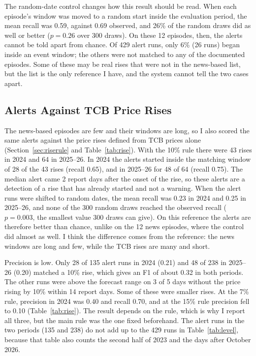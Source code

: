 The random-date control changes how this result should be read. When each episode's window was moved to a random start inside the evaluation period, the mean recall was 0.59, against 0.69 observed, and 26\% of the random draws did as well or better ($p=0.26$ over 300 draws). On these 12 episodes, then, the alerts cannot be told apart from chance. Of 429 alert runs, only 6\% (26 runs) began inside an event window; the others were not matched to any of the documented episodes. Some of these may be real rises that were not in the news-based list, but the list is the only reference I have, and the system cannot tell the two cases apart.

\begin{table}[H]\centering\small
\caption[The 12 documented episodes and alert detection]{The 12 documented episodes and whether an alert started inside the window (level 0.95). Lead is the number of days between the first alert and the news peak, negative if before.}\label{tab:events}

\par{}
\end{table}

\subsection{Alerts Against TCB Price Rises}
The news-based episodes are few and their windows are long, so I also scored the same alerts against the price rises defined from TCB prices alone (Section~\ref{sec:riserule} and Table~\ref{tab:rise}). With the 10\% rule there were 43 rises in 2024 and 64 in 2025--26. In 2024 the alerts started inside the matching window of 28 of the 43 rises (recall 0.65), and in 2025--26 for 48 of 64 (recall 0.75). The median alert came 2 report days after the onset of the rise, so these alerts are a detection of a rise that has already started and not a warning. When the alert runs were shifted to random dates, the mean recall was 0.23 in 2024 and 0.25 in 2025--26, and none of the 300 random draws reached the observed recall ($p=0.003$, the smallest value 300 draws can give). On this reference the alerts are therefore better than chance, unlike on the 12 news episodes, where the control did almost as well. I think the difference comes from the reference: the news windows are long and few, while the TCB rises are many and short.

Precision is low. Only 28 of 135 alert runs in 2024 (0.21) and 48 of 238 in 2025--26 (0.20) matched a 10\% rise, which gives an F1 of about 0.32 in both periods. The other runs were above the forecast range on 3 of 5 days without the price rising by 10\% within 14 report days. Some of these were smaller rises. At the 7\% rule, precision in 2024 was 0.40 and recall 0.70, and at the 15\% rule precision fell to 0.10 (Table~\ref{tab:rise}). The result depends on the rule, which is why I report all three, but the main rule was the one fixed beforehand. The alert runs in the two periods (135 and 238) do not add up to the 429 runs in Table~\ref{tab:level}, because that table also counts the second half of 2023 and the days after October 2026.

